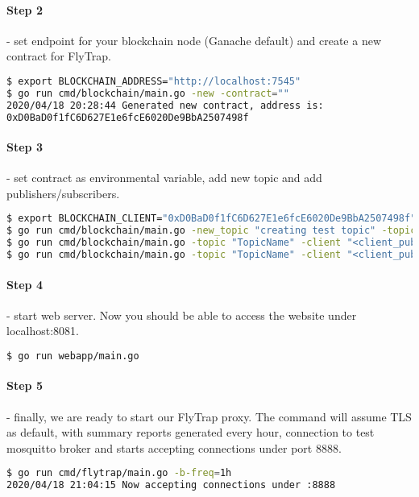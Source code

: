 \paragraph{Step 2} - set endpoint for your blockchain node (Ganache default) and create a new contract for FlyTrap.
\begin{lstlisting}[language=bash]
$ export BLOCKCHAIN_ADDRESS="http://localhost:7545"
$ go run cmd/blockchain/main.go -new -contract=""
2020/04/18 20:28:44 Generated new contract, address is:
0xD0BaD0f1fC6D627E1e6fcE6020De9BbA2507498f
\end{lstlisting}
\paragraph{Step 3} - set contract as environmental variable, add new topic and add publishers/subscribers.
\begin{lstlisting}[language=bash,breaklines=true]
$ export BLOCKCHAIN_CLIENT="0xD0BaD0f1fC6D627E1e6fcE6020De9BbA2507498f"
$ go run cmd/blockchain/main.go -new_topic "creating test topic" -topic "TopicName"
$ go run cmd/blockchain/main.go -topic "TopicName" -client "<client_pubkey>" -pub "adding test publisher"
$ go run cmd/blockchain/main.go -topic "TopicName" -client "<client_pubkey>" -sub "adding test subscriber"
\end{lstlisting}
\paragraph{Step 4} - start web server. Now you should be able to access the website under localhost:8081.
\begin{lstlisting}[language=bash,breaklines=true]
$ go run webapp/main.go
\end{lstlisting}
\paragraph{Step 5} - finally, we are ready to start our FlyTrap proxy. The command will assume TLS as default, with summary reports generated every hour, connection to test mosquitto broker and starts accepting connections under port 8888.
\begin{lstlisting}[language=bash,breaklines=true]
$ go run cmd/flytrap/main.go -b-freq=1h
2020/04/18 21:04:15 Now accepting connections under :8888
\end{lstlisting}
